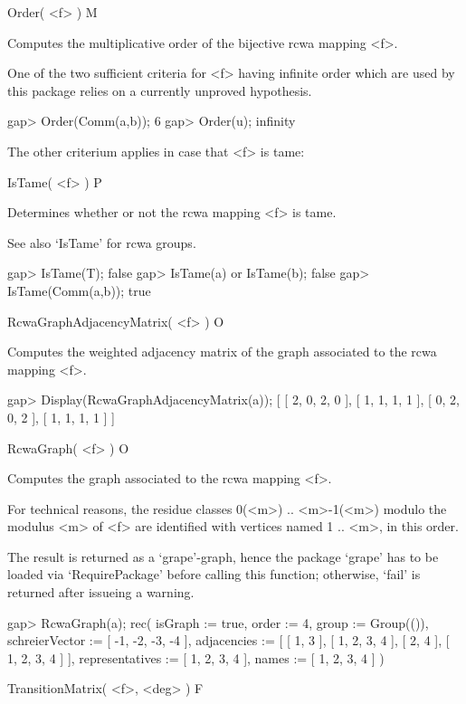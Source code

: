 
\>Order( <f> ) M

Computes the multiplicative order of the bijective rcwa mapping <f>.

One of the two sufficient criteria for <f> having infinite order which
are used by this package relies on a currently unproved hypothesis.

\beginexample
gap> Order(Comm(a,b));
6
gap> Order(u);
infinity
\endexample

The other criterium applies in case that <f> is tame:

\>IsTame( <f> ) P

Determines whether or not the rcwa mapping <f> is tame.

See also `IsTame' for rcwa groups.

\beginexample
gap> IsTame(T);
false
gap> IsTame(a) or IsTame(b);
false
gap> IsTame(Comm(a,b));
true
\endexample


\>RcwaGraphAdjacencyMatrix( <f> ) O

Computes the weighted adjacency matrix of the graph associated to the
rcwa mapping <f>.

\beginexample
gap> Display(RcwaGraphAdjacencyMatrix(a));
[ [  2,  0,  2,  0 ],
  [  1,  1,  1,  1 ],
  [  0,  2,  0,  2 ],
  [  1,  1,  1,  1 ] ]
\endexample

\>RcwaGraph( <f> ) O

Computes the graph associated to the rcwa mapping <f>.

For technical reasons, the residue classes 0(<m>) .. <m>-1(<m>) modulo
the modulus <m> of <f> are identified with vertices named 1 .. <m>, in
this order.

The result is returned as a `grape'-graph, hence the package `grape' has
to be loaded via `RequirePackage' before calling this function; 
otherwise, `fail' is returned after issueing a warning.

\beginexample
gap> RcwaGraph(a);
rec( isGraph := true, order := 4, group := Group(()), 
  schreierVector := [ -1, -2, -3, -4 ], 
  adjacencies := [ [ 1, 3 ], [ 1, 2, 3, 4 ], [ 2, 4 ], [ 1, 2, 3, 4 ] ], 
  representatives := [ 1, 2, 3, 4 ], names := [ 1, 2, 3, 4 ] )
\endexample

\>TransitionMatrix( <f>, <deg> ) F

